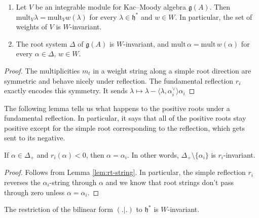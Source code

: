 \documentclass[12pt]{article}
\begin{document}
\begin{proposition}\label{prop:Weyl-invariance}
\leavevmode
\begin{enumerate}[label=(\alph*)]
\item Let $V$ be an integrable module for Kac--Moody algebra $\mathfrak{g}(A)$. 
Then $\mathrm{mult}_V \lambda = \mathrm{mult}_V w(\lambda)$ for every 
$\lambda \in \mathfrak{h}^*$ and $w\in W$. In particular, the set of weights of $V$ 
is $W$-invariant.

\item The root system $\Delta$ of $\mathfrak{g}(A)$ is $W$-invariant, and 
$\mathrm{mult}\,\alpha = \mathrm{mult}\,w(\alpha)$ for every 
$\alpha \in \Delta$, $w\in W$.
\end{enumerate}
\end{proposition}

\begin{proof}The multiplicities $m_t$ in a weight string along a simple root direction are symmetric and behave nicely under reflection. The fundamental reflection $r_i$ exactly encodes this symmetry. It sends
$\lambda \mapsto \lambda - \langle \lambda,\alpha_i^\vee \rangle \alpha_i$
\end{proof}

The following lemma tells us what happens to the positive roots under a fundamental reflection. In particular, it says that all of the positive roots stay positive except for the simple root corresponding to the reflection, which gets sent to its negative.
\begin{lemma}\label{lem:3.7}
If $\alpha \in \Delta_+$ and $r_i(\alpha) < 0$, then $\alpha = \alpha_i$. 
In other words, $\Delta_+ \setminus \{\alpha_i\}$ is $r_i$-invariant.
\end{lemma}

\begin{proof}
Follows from Lemma \ref{lem:rt-string}. In particular, the simple reflection $r_i$ reverses the $\alpha_i$-string through $\alpha$ and we know that root strings don't pass through zero unless $\alpha = \alpha_i$.
\end{proof}

\begin{proposition}[3.9]
The restriction of the bilinear form $(.|.)$ to $\mathfrak{h}^*$ is $W$-invariant.
\end{proposition}
\end{document}
